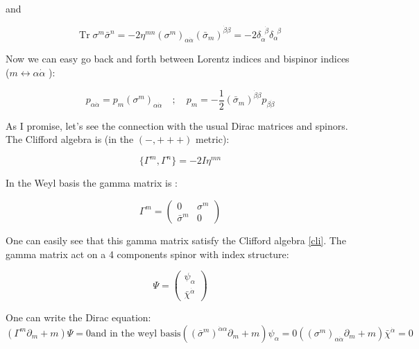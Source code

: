 and 

\begin{subequations}
\begin{equation}
 \text{Tr} \;\sigma^{m}\bar{\sigma}^{n}  = -2\eta^{mn}
 \label{Trace}
\end{equation}
\begin{equation}
(\sigma^{m})_{\alpha\dot{\alpha}} (\bar{\sigma}_{m})^{\dot{\beta}\beta}= -2 \delta^{\;\;\dot{\beta}}_{\dot{\alpha}}\delta^{\;\;\beta}_{\alpha}
\end{equation}
\end{subequations}




Now we can easy go back and forth between Lorentz indices and bispinor indices ($ m \leftrightarrow \alpha \dot{\alpha}$ ):


\begin{equation}
p_{\alpha \dot{\alpha}} = p_{m}(\sigma^{m})_{\alpha\dot{\alpha}} \quad ; \quad p_{m} =- \frac{1}{2} (\bar{\sigma}_{m})^{\dot{\beta}\beta} p_{\beta \dot{\beta}}
\end{equation}



As I promise, let's see the connection with the usual Dirac matrices and spinors. The Clifford algebra is (in the $(-,+++)$ metric):

\begin{equation}
\{\Gamma^{m} ,\Gamma^{n}\} = -2I\eta^{mn}
\label{cli}
\end{equation}

In the Weyl basis the gamma matrix is :

\begin{equation}
\Gamma^{m} =
\begin{pmatrix} 
0 & \sigma^{m}\\
\bar{\sigma}^{m} & 0 
\end{pmatrix}
\end{equation}

One can easily see that this gamma matrix satisfy the Clifford algebra \eqref{cli}. The gamma matrix act on a 4 components spinor with index structure: 

\begin{equation*}
\Psi =
\begin{pmatrix} 
 \psi_{\alpha}\\
\bar{\chi}^{\dot{\alpha}}   
\end{pmatrix}
\end{equation*}

One can write the Dirac equation:
\begin{subequations}
\begin{equation}
( \Gamma^{m}\partial_{m} + m )\Psi = 0
\end{equation}
\text{and in the weyl basis}
\begin{equation}
( (\bar{\sigma}^{m})^{ \dot{\alpha} \alpha}\partial_{m} + m )\psi_{\alpha} = 0
\end{equation}
\begin{equation}
((\sigma^{m})_{\alpha \dot{\alpha}} \partial_{m} + m )\bar{\chi}^{\dot{\alpha}} =0
\end{equation}
\end{subequations}


